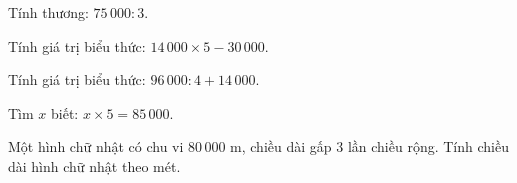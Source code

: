 \begin{ex} %
Tính thương: $75\,000 : 3$.
\end{ex}

\begin{ex} %
Tính giá trị biểu thức: $14\,000 \times 5 - 30\,000$.
\end{ex}

\begin{ex} %
Tính giá trị biểu thức: $96\,000 : 4 + 14\,000$.
\end{ex}

\begin{ex} %
Tìm $x$ biết: $x \times 5 = 85\,000$.
\end{ex}

\begin{ex} %
Một hình chữ nhật có chu vi $80\,000\text{ m}$, chiều dài gấp 3 lần chiều rộng. Tính chiều dài hình chữ nhật theo mét.
\end{ex}
